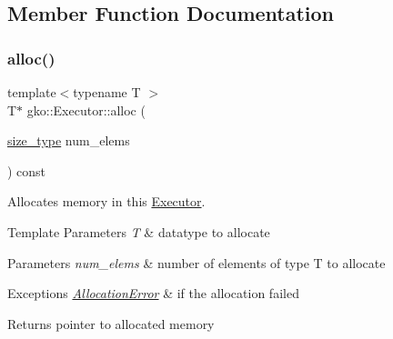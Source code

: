\subsection{Member Function Documentation}
\mbox{\label{classgko_1_1Executor_a5a216c2b1f7ceb8a0190c08941c1c687}} 
\subsubsection{\texorpdfstring{alloc()}{alloc()}}
{\footnotesize\ttfamily template$<$typename T $>$ \\
T$\ast$ gko\+::\+Executor\+::alloc (\begin{DoxyParamCaption}\item[{\hyperlink{namespacegko_a6e5c95df0ae4e47aab2f604a22d98ee7}{size\+\_\+type}}]{num\+\_\+elems }\end{DoxyParamCaption}) const\hspace{0.3cm}{\ttfamily [inline]}}



Allocates memory in this \hyperlink{classgko_1_1Executor}{Executor}. 


\begin{DoxyTemplParams}{Template Parameters}
{\em T} & datatype to allocate\\
\hline
\end{DoxyTemplParams}

\begin{DoxyParams}{Parameters}
{\em num\+\_\+elems} & number of elements of type T to allocate\\
\hline
\end{DoxyParams}

\begin{DoxyExceptions}{Exceptions}
{\em \hyperlink{classgko_1_1AllocationError}{Allocation\+Error}} & if the allocation failed\\
\hline
\end{DoxyExceptions}
\begin{DoxyReturn}{Returns}
pointer to allocated memory 
\end{DoxyReturn}
\mbox{\label{classgko_1_1Executor_adf7573e4a7e267fcb821eb9049a1054f}} 
